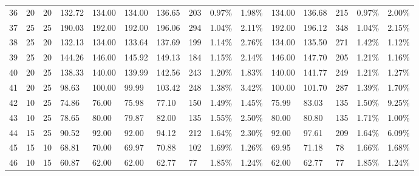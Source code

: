 \begin{longtable}{l|ll|ll|lllll|lllll}
  36 & 20                         & 20                         & 132.72                    & 134.00      & 134.00        & 136.65 & 203 & 0.97\%  & 1.98\% & 134.00 & 136.68 & 215 & 0.97\%  & 2.00\%  \\
  37 & 25                         & 25                         & 190.03                    & 192.00      & 192.00        & 196.06 & 294 & 1.04\%  & 2.11\% & 192.00 & 196.12 & 348 & 1.04\%  & 2.15\%  \\
  38 & 25                         & 20                         & 132.13                    & 134.00      & 133.64        & 137.69 & 199 & 1.14\%  & 2.76\% & 134.00 & 135.50 & 271 & 1.42\%  & 1.12\%  \\
  39 & 25                         & 20                         & 144.26                    & 146.00      & 145.92        & 149.13 & 184 & 1.15\%  & 2.14\% & 146.00 & 147.70 & 205 & 1.21\%  & 1.16\%  \\
  40 & 20                         & 25                         & 138.33                    & 140.00      & 139.99        & 142.56 & 243 & 1.20\%  & 1.83\% & 140.00 & 141.77 & 249 & 1.21\%  & 1.27\%  \\
  41 & 20                         & 25                         & 98.63                     & 100.00      & 99.99         & 103.42 & 248 & 1.38\%  & 3.42\% & 100.00 & 101.70 & 287 & 1.39\%  & 1.70\%  \\
  42 & 10                         & 25                         & 74.86                     & 76.00       & 75.98         & 77.10  & 150 & 1.49\%  & 1.45\% & 75.99  & 83.03  & 135 & 1.50\%  & 9.25\%  \\
  43 & 10                         & 25                         & 78.65                     & 80.00       & 79.87         & 82.00  & 135 & 1.55\%  & 2.50\% & 80.00  & 80.80  & 135 & 1.71\%  & 1.00\%  \\
  44 & 15                         & 25                         & 90.52                     & 92.00       & 92.00         & 94.12  & 212 & 1.64\%  & 2.30\% & 92.00  & 97.61  & 209 & 1.64\%  & 6.09\%  \\
  45 & 15                         & 10                         & 68.81                     & 70.00       & 69.97         & 70.88  & 102 & 1.69\%  & 1.26\% & 69.95  & 71.18  & 78  & 1.66\%  & 1.68\%  \\
  46 & 10                         & 15                         & 60.87                     & 62.00       & 62.00         & 62.77  & 77  & 1.85\%  & 1.24\% & 62.00  & 62.77  & 77  & 1.85\%  & 1.24\%  \\

\end{longtable}
